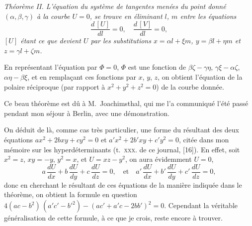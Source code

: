 \documentclass[11pt,a4paper]{book}
\begin{document}
\smallskip
\textit{Th\'eor\`eme II. L'\'equation du syst\`eme de tangentes men\'ees du point donn\'e $(\alpha, \beta, \gamma)$ \`a la courbe $U = 0$, se trouve en \'eliminant $l$, $m$ entre les \'equations
\[
\frac{d\,[U]}{dl} = 0, \quad \frac{d\,[V]}{dl} = 0,
\]
$[U]$ \'etant ce que devient $U$ par les substitutions $x = \alpha l + \xi m$, $y = \beta l + \eta m$ et $z = \gamma l + \zeta m$.}
\smallskip

En repr\'esentant l'\'equation par $\Phi = 0$, $\Phi$ est une fonction de $\beta\zeta - \gamma\eta$, $\gamma\xi - \alpha\zeta$, $\alpha\eta - \beta\xi$, et en rempla\c{c}ant ces fonctions par $x$, $y$, $z$, on obtient l'\'equation de la polaire r\'eciproque (par rapport \`a $x^2 + y^2 + z^2 = 0$) de la courbe donn\'ee.

Ce beau th\'eor\`eme est d\^u \`a M.~Joachimsthal, qui me l'a communiqu\'e l'\'et\'e pass\'e pendant mon s\'ejour \`a Berlin, avec une d\'emonstration.

On d\'eduit de l\`a, comme cas tr\`es particulier, une forme du r\'esultant des deux \'equations $ax^2 + 2bxy + cy^2 = 0$ et $a'x^2 + 2b'xy + c'y^2 = 0$, cit\'ee dans mon m\'emoire sur les hyperd\'eterminants (t.~\textsc{xxx}. de ce journal, [16]). En effet, soit $x^2 = z$, $xy = -y$, $y^2 = x$, et $U = xz - y^2$, on aura \'evidemment $U = 0$,
\[
a\,\frac{dU}{dx} + b\,\frac{dU}{dy} + c\,\frac{dU}{dz} = 0, \quad \text{et} \quad a'\,\frac{dU}{dx} + b'\,\frac{dU}{dy} + c'\,\frac{dU}{dz} = 0,
\]
donc en cherchant le r\'esultant de ces \'equations de la mani\`ere indiqu\'ee dans le th\'eor\`eme, on obtient la formule en question $4(ac - b^2)\,(a'c' - b'^2) - (ac' + a'c - 2bb')^2 = 0$. Cependant la v\'eritable g\'en\'eralisation de cette formule, \`a ce que je crois, reste encore \`a trouver.
\end{document}
